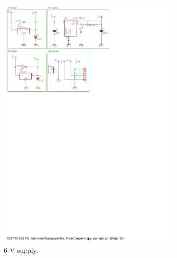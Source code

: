 \begin{figure}[H] %
\centering
\begin{subfigure}{0.3\linewidth}
\centering
\includegraphics[scale=0.8,trim={0 24cm 15.7cm 0.6cm},clip]{img/powersupply.pdf}
\caption{6 V supply.}
\label{fig::sch_power_6V}
\end{subfigure}
\begin{subfigure}{0.4\linewidth}
\centering

\end{subfigure}
\end{figure}
